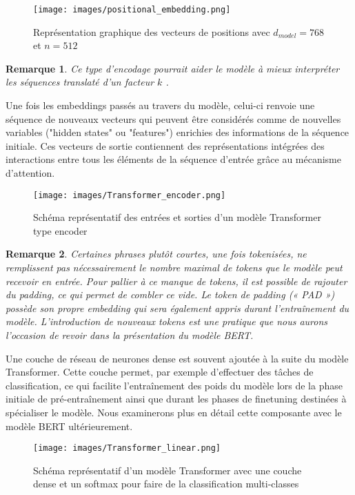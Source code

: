 \documentclass[12pt]{article}
\newtheorem{rmq}{Remarque}
\theoremstyle{definition}
\begin{document}
		\begin{figure*}[!h]
	\centering
	\texttt{[image: images/positional\_embedding.png]}
	\caption{Représentation graphique des vecteurs de positions avec $d_{model} = 768$ et $n=512$}
\end{figure*}

\begin{rmq}
	Ce type d’encodage pourrait aider le modèle à mieux interpréter les séquences translaté d'un facteur $k$ \cite{a_i_a_y_n}.
\end{rmq}

Une fois les embeddings passés au travers du modèle, celui-ci renvoie une séquence de nouveaux vecteurs qui peuvent être considérés comme de nouvelles variables ("hidden states" ou "features") enrichies des informations de la séquence initiale. Ces vecteurs de sortie contiennent des représentations intégrées des interactions entre tous les éléments de la séquence d'entrée grâce au mécanisme d'attention.

\begin{figure*}[!h]
	\centering
	\texttt{[image: images/Transformer\_encoder.png]}
	\caption{Schéma représentatif des entrées et sorties d'un modèle Transformer type encoder}
\end{figure*}
\newpage 
\begin{rmq}
	Certaines phrases plutôt courtes, une fois tokenisées, ne remplissent pas nécessairement le nombre maximal de tokens que le modèle peut recevoir en entrée. Pour pallier à ce manque de tokens, il est possible de rajouter du padding, ce qui permet de combler ce vide. Le token de padding (« PAD ») possède son propre embedding qui sera également appris durant l'entraînement du modèle. L'introduction de nouveaux tokens est une pratique que nous aurons l'occasion de revoir dans la présentation du modèle BERT.   
\end{rmq}

Une couche de réseau de neurones dense est souvent ajoutée à la suite du modèle Transformer. Cette couche permet, par exemple d'effectuer des tâches de classification, ce qui facilite l'entraînement des poids du modèle lors de la phase initiale de pré-entraînement ainsi que durant les phases de finetuning destinées à spécialiser le modèle. Nous examinerons plus en détail cette composante avec le modèle BERT ultérieurement.

\begin{figure*}[!h]
	\centering
	\texttt{[image: images/Transformer\_linear.png]}
	\caption{Schéma représentatif d'un modèle Transformer avec une couche dense et un softmax pour faire de la classification multi-classes}
\end{figure*}
\end{document}
